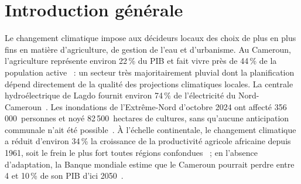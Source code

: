 \chapter*{Introduction générale}


\vspace{1em}

\label{intro:contexte}

Le changement climatique impose aux décideurs locaux des choix de plus en plus fins en matière d'agriculture, de gestion de l'eau et d'urbanisme. Au Cameroun, l'agriculture représente environ 22\,\% du PIB et fait vivre près de 44\,\% de la population active~\cite{wb_ccdr_cameroon_2022} : un secteur très majoritairement pluvial dont la planification dépend directement de la qualité des projections climatiques locales. La centrale hydroélectrique de Lagdo fournit environ 74\,\% de l'électricité du Nord-Cameroun~\cite{nonki_lagdo_2021}. Les inondations de l'Extrême-Nord d'octobre 2024 ont affecté 356\,000~personnes et noyé 82\,500~hectares de cultures, sans qu'aucune anticipation communale n'ait été possible~\cite{ocha_cameroon_2024}. À l'échelle continentale, le changement climatique a réduit d'environ 34\,\% la croissance de la productivité agricole africaine depuis 1961, soit le frein le plus fort toutes régions confondues~\cite{ipcc_ar6_africa_2022} ; en l'absence d'adaptation, la Banque mondiale estime que le Cameroun pourrait perdre entre 4 et 10\,\% de son PIB d'ici 2050~\cite{wb_ccdr_cameroon_2022}.

